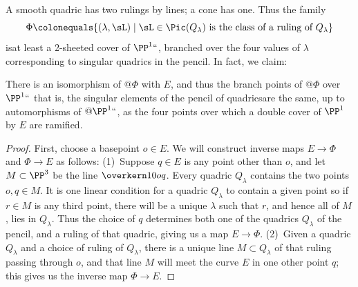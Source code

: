 A smooth quadric has two rulings by lines; a cone has one. Thus the 
%
family
$$
\Phi \colonequals \{ (\lambda, \sL) \mid \sL \in \Pic(Q_\lambda) \text{ is the class of a ruling of } Q_\lambda \}
$$
is\emdash at least 
%
a 2-sheeted cover of $\PP^1` `$, 
%
branched over the four values of $\lambda$ corresponding to singular
quadrics in the pencil. In fact, we claim:
%
%

\begin{proposition}\label{rulings on pencil}
There is an isomorphism of $@\Phi$ with $E$, and thus the branch points
of $@\Phi$ over $\PP^1` `$\emdash 
that is, the singular elements of
the pencil of quadrics\emdash are the same, up to automorphisms of
$@\PP^1` `$, as the four points over which a double cover of $\PP^1$ by $E$
are ramified.
\unif
\end{proposition} 

\begin{proof}
First, choose a basepoint $o \in E$. We will construct inverse maps $E \to \Phi$ and $\Phi \to E$ as follows:
\smallbreak\noindent
(1)\,
Suppose $q \in E$ is any point other than $o$, and let 
$M\subset \PP^3$ be the line $\overkern10{oq}$.
Every quadric $Q_\lambda$ contains the two points $o, q \in M$. It is one linear condition
for a quadric $Q_{\lambda}$ to contain a given point  so if $r\in M$ is any third point, there will be a unique $\lambda$ such that $r$, and hence all of $M$, lies in $Q_\lambda$. Thus the choice of $q$ determines both one of the quadrics $Q_\lambda$ of the pencil, and a ruling of that quadric, giving us a map $E \to \Phi$.
\smallbreak\noindent
(2)\,
Given a quadric $Q_\lambda$ and a choice of ruling of $Q_\lambda$, there is a unique line $M \subset Q_\lambda$ of that ruling passing through $o$, and that line $M$ will meet the curve $E$ in one other point $q$; this gives us the inverse map $\Phi \to E$.
\end{proof}

